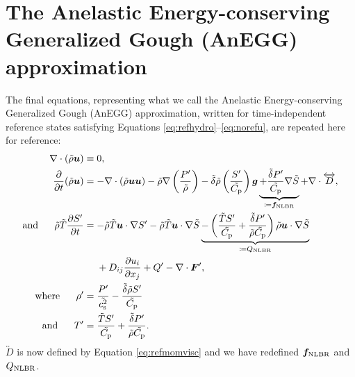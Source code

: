 \documentclass[12pt]{article}
\newcommand{\vecf}{\bm{F}}
\newcommand{\heatnlbr}{Q_{\rm NLBR}}
\newcommand{\forcenlbr}{\bm{f}_{\rm NLBR}}
\begin{document}
\section{The Anelastic Energy-conserving Generalized Gough (AnEGG) approximation}\label{sec:anegg}
The final equations, representing what we call the Anelastic Energy-conserving Generalized Gough (AnEGG) approximation, written for time-independent reference states satisfying Equations \eqref{eq:refhydro}--\eqref{eq:norefu}, are repeated here for reference:
\begin{subequations}\label{eq:egg}
\begin{align}
	\Div(\rhotilde\vecu)&\equiv 0\label{eq:eggcont},\\
	\pderiv{}{t}(\rhotilde\vecu)&=-\Div(\rhotilde\vecu\vecu) -\rhotilde\nabla\left(\frac{\prsprime}{\rhotilde}\right) - \deltatilde \rhotilde \left(\frac{\entrprime}{\cptilde}\right) \vecg \underbrace{+ \frac{\deltatilde  \prsprime}{\cptilde} \nabla\entrtilde}_{\define \forcenlbr}+\Div \overleftrightarrow{D},\label{eq:eggmom}\\	
		\andd \rhotilde\tmptilde\pderiv{\entrprime}{t}&= -\rhotilde\tmptilde\ugrad \entrprime - \rhotilde\tmptilde \ugrad \entrtilde \underbrace{ -  \left(\frac{\tmptilde \entrprime}{\cptilde} + \frac{\deltatilde  \prsprime}{\rhotilde\cptilde}\right)  \rhotilde \ugrad\entrtilde }_{\define \heatnlbr} \nonumber\\
		&\ \ \ \ +D_{ij}\pderiv{u_i}{x_j} + Q^\prime- \Div\vecf^\prime,\label{eq:eggen}\\
	\where \rhoprime &= \frac{\prsprime}{\cssqtilde}-\frac{\deltatilde\rhotilde \entrprime}{\cptilde}\label{eq:eggenrhoprime}\\
\andd \tmpprime &=  \frac{\tmptilde \entrprime}{\cptilde} + \frac{\deltatilde \prsprime}{\rhotilde\cptilde}.\label{eq:eggentmpprime}
\end{align}
\end{subequations}
$\overleftrightarrow{D}$ is  now defined by Equation \eqref{eq:refmomvisc} and we have redefined $\forcenlbr$ and $\heatnlbr$. %
\end{document}
